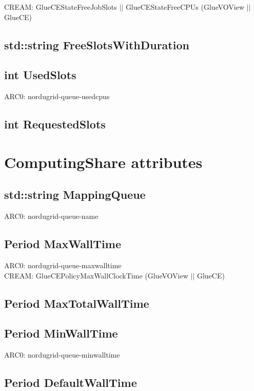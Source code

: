 \documentclass{book}
\begin{document}
CREAM: GlueCEStateFreeJobSlots $||$ GlueCEStateFreeCPUs (GlueVOView $||$ GlueCE)

\subsection*{std::string FreeSlotsWithDuration}

\subsection*{int UsedSlots}

ARC0: nordugrid-queue-usedcpus

\subsection*{int RequestedSlots}

\section{ComputingShare attributes}

\subsection*{std::string MappingQueue}

ARC0: nordugrid-queue-name

\subsection*{Period MaxWallTime}

ARC0: nordugrid-queue-maxwalltime \\
CREAM: GlueCEPolicyMaxWallClockTime (GlueVOView $||$ GlueCE)

\subsection*{Period MaxTotalWallTime}

\subsection*{Period MinWallTime}

ARC0: nordugrid-queue-minwalltime

\subsection*{Period DefaultWallTime}
\end{document}
